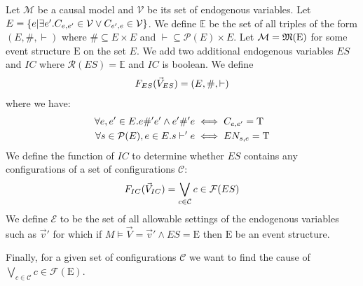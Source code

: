 Let $\mathcal{M}$ be a causal model and $\mathcal{V}$ be its set of
endogenous variables.
Let $E = \{e|\exists e'. C_{e,e'} \in \mathcal{V} \vee C_{e',e} \in \mathcal{V} \}$.
We define $\mathbb{E}$ be the set of all
triples of the form $(E,\#,\vdash)$ where $\# \subseteq E \times E$
and $\vdash \subseteq \mathcal{P}(E) \times E$.
Let $\mathcal{M} = \mathfrak{M}(\mathrm{E})$ for some event structure
$\mathrm{E}$ on the set $E$.
We add two additional endogenous variables $ES$ and $IC$
where $\mathcal{R}(ES) = \mathbb{E}$ and $IC$ is boolean.
We define
\begin{align*}
    F_{ES}(\vec V_{ES}) = (E,\#,\vdash)
\end{align*}
where we have:
\begin{align*}
    \forall e,e' \in E. e \#' e' \wedge e' \#' e
     & \iff C_{e,e'} = \mathrm{T} \\
    \forall s \in \mathcal{P}(E), e \in E.  s \vdash' e
     & \iff EN_{s,e} = \mathrm{T}
\end{align*}
We define the function of $IC$ to determine whether $ES$
contains any configurations of a set of configurations
$\mathcal{C}$:
\begin{align*}
    F_{IC}(\vec V_{IC}) = \bigvee_{c \in \mathcal{C}}c \in \mathcal{F}(ES)
\end{align*}
We define $\mathcal{E}$ to be the set of all allowable
settings of the endogenous variables such as $\vec v'$
for which if $M \vDash \vec V = \vec v' \wedge ES = \mathrm{E}$ then $\mathrm{E}$ be an event structure.

Finally, for a given set of configurations $\mathcal{C}$
we want to find the cause of
$\bigvee_{c \in \mathcal{C}}c \in \mathcal{F}(\mathrm{E})$.

